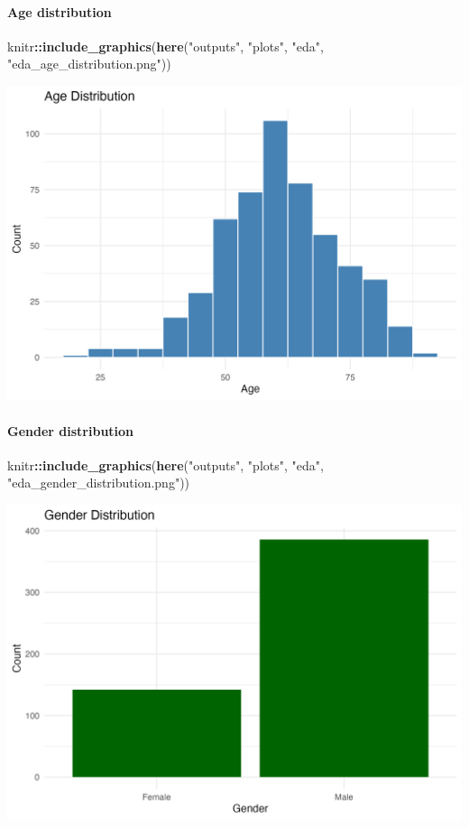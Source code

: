 \documentclass[
  11pt,
]{article}
\newenvironment{Shaded}{\begin{snugshade}}{\end{snugshade}}
\newcommand{\FunctionTok}[1]{\textcolor[rgb]{0.13,0.29,0.53}{\textbf{#1}}}
\newcommand{\NormalTok}[1]{#1}
\newcommand{\SpecialCharTok}[1]{\textcolor[rgb]{0.81,0.36,0.00}{\textbf{#1}}}
\newcommand{\StringTok}[1]{\textcolor[rgb]{0.31,0.60,0.02}{#1}}
\begin{document}
\paragraph{Age distribution}\label{age-distribution}

\begin{Shaded}
\begin{Highlighting}[]
\NormalTok{knitr}\SpecialCharTok{::}\FunctionTok{include\_graphics}\NormalTok{(}\FunctionTok{here}\NormalTok{(}\StringTok{"outputs"}\NormalTok{, }\StringTok{"plots"}\NormalTok{, }\StringTok{"eda"}\NormalTok{, }\StringTok{"eda\_age\_distribution.png"}\NormalTok{))}
\end{Highlighting}
\end{Shaded}

\includegraphics[width=0.8\linewidth]{../outputs/plots/eda/eda_age_distribution}

\paragraph{Gender distribution}\label{gender-distribution}

\begin{Shaded}
\begin{Highlighting}[]
\NormalTok{knitr}\SpecialCharTok{::}\FunctionTok{include\_graphics}\NormalTok{(}\FunctionTok{here}\NormalTok{(}\StringTok{"outputs"}\NormalTok{, }\StringTok{"plots"}\NormalTok{, }\StringTok{"eda"}\NormalTok{, }\StringTok{"eda\_gender\_distribution.png"}\NormalTok{))}
\end{Highlighting}
\end{Shaded}

\includegraphics[width=0.8\linewidth]{../outputs/plots/eda/eda_gender_distribution}
\end{document}
